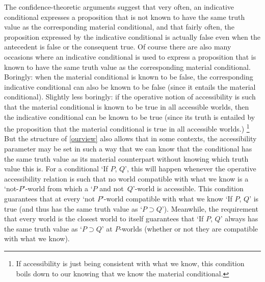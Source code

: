 \documentclass[If.tex]{subfiles}
\begin{document}
The confidence-theoretic arguments suggest that very often, an indicative conditional expresses a proposition that is not known to have the same truth value as the corresponding material conditional, and that fairly often, the proposition expressed by the indicative conditional is actually false even when the antecedent is false or the consequent true.  Of course there are also many occasions where an indicative conditional is used to express a proposition that is known to have the same truth value as the corresponding material conditional.  Boringly: when the material conditional is known to be false, the corresponding indicative conditional can also be known to be false (since it entails the material conditional).  Slightly less boringly: if the operative notion of accessibility is such that the material conditional is known to be true in all accessible worlds, then the indicative conditional can be known to be true (since its truth is entailed by the proposition that the material conditional is true in all accessible worlds.)%
\footnote{If accessibility is just being consistent with what we know, this condition boils down to our knowing that we know the material conditional.}
But the structure of \ref{ourview} also allows that in some contexts, the accessibility parameter may be set in such a way that we can know that the conditional has the same truth value as its material counterpart without knowing which truth value this is.  For a conditional ‘If $P$, $Q$’, this will happen whenever the operative accessibility relation is such that no world compatible with what we know is a ‘not-$P$’-world from which a ‘$P$ and not~$Q$’-world is accessible.  This condition guarantees that at every ‘not $P$’-world compatible with what we know ‘If $P$, $Q$’ is true (and thus has the same truth value as ‘$P⊃Q$’).  Meanwhile, the requirement that every world is the closest world to itself guarantees that ‘If $P$, $Q$’ always has the same truth value as ‘$P⊃Q$’ at $P$-worlds (whether or not they are compatible with what we know).  
\end{document}
